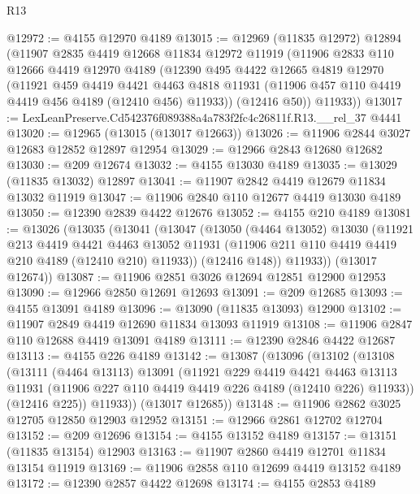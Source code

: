 \begin{lexlean}{R13}
\begin{coremodule}
@12972 := @4155 @12970 @4189
@13015 := @12969
    (@11835 @12972)
    @12894
    (@11907
      @2835
      @4419
      @12668
      @11834
      @12972
      @11919
      (@11906
        @2833
        @110
        @12666
        @4419
        @12970
        @4189
        (@12390
          @495
          @4422
          @12665
          @4819
          @12970
          (@11921
            @459
            @4419
            @4421
            @4463
            @4818
            @11931
            (@11906 @457 @110 @4419 @4419 @456 @4189 (@12410 @456) @11933))
          (@12416 @50))
        @11933))
@13017 := LexLeanPreserve.Cd542376f089388a4a783f2fc4c26811f.R13.__rel_37 @4441
@13020 := @12965 (@13015 (@13017 @12663))
@13026 := @11906 @2844 @3027 @12683 @12852 @12897 @12954
@13029 := @12966 @2843 @12680 @12682
@13030 := @209 @12674
@13032 := @4155 @13030 @4189
@13035 := @13029 (@11835 @13032) @12897
@13041 := @11907 @2842 @4419 @12679 @11834 @13032 @11919
@13047 := @11906 @2840 @110 @12677 @4419 @13030 @4189
@13050 := @12390 @2839 @4422 @12676
@13052 := @4155 @210 @4189
@13081 := @13026
    (@13035
      (@13041
        (@13047
          (@13050
            (@4464 @13052)
            @13030
            (@11921
              @213
              @4419
              @4421
              @4463
              @13052
              @11931
              (@11906 @211 @110 @4419 @4419 @210 @4189 (@12410 @210) @11933))
            (@12416 @148))
          @11933))
      (@13017 @12674))
@13087 := @11906 @2851 @3026 @12694 @12851 @12900 @12953
@13090 := @12966 @2850 @12691 @12693
@13091 := @209 @12685
@13093 := @4155 @13091 @4189
@13096 := @13090 (@11835 @13093) @12900
@13102 := @11907 @2849 @4419 @12690 @11834 @13093 @11919
@13108 := @11906 @2847 @110 @12688 @4419 @13091 @4189
@13111 := @12390 @2846 @4422 @12687
@13113 := @4155 @226 @4189
@13142 := @13087
    (@13096
      (@13102
        (@13108
          (@13111
            (@4464 @13113)
            @13091
            (@11921
              @229
              @4419
              @4421
              @4463
              @13113
              @11931
              (@11906 @227 @110 @4419 @4419 @226 @4189 (@12410 @226) @11933))
            (@12416 @225))
          @11933))
      (@13017 @12685))
@13148 := @11906 @2862 @3025 @12705 @12850 @12903 @12952
@13151 := @12966 @2861 @12702 @12704
@13152 := @209 @12696
@13154 := @4155 @13152 @4189
@13157 := @13151 (@11835 @13154) @12903
@13163 := @11907 @2860 @4419 @12701 @11834 @13154 @11919
@13169 := @11906 @2858 @110 @12699 @4419 @13152 @4189
@13172 := @12390 @2857 @4422 @12698
@13174 := @4155 @2853 @4189

\end{coremodule}
\end{lexlean}
